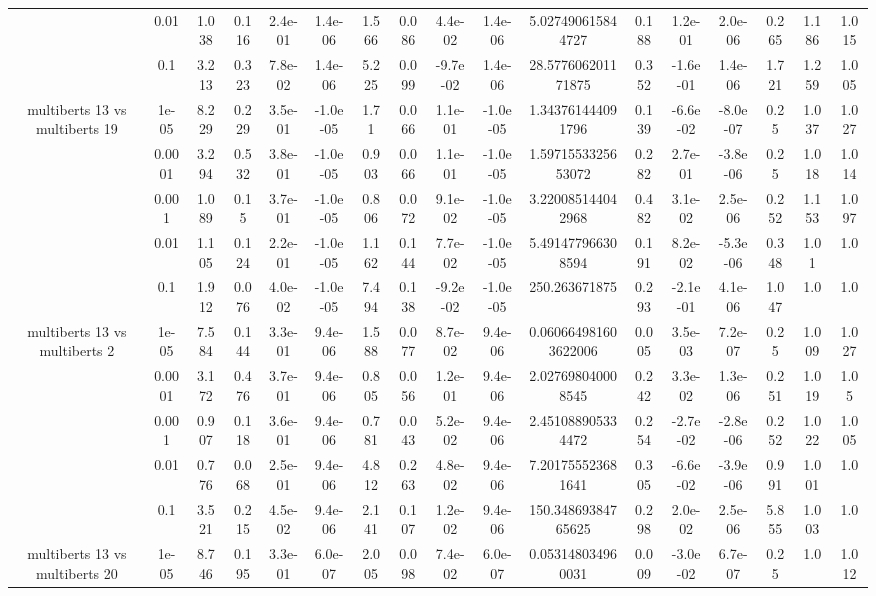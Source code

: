 \begin{tabular}{|c|c|c|c|c|c|c|c|c|c|c|c|c|c|c|c|c|}
 & 0.01 & 1.038 & 0.116 & 2.4e-01 & 1.4e-06 & 1.566 & 0.086 & 4.4e-02 & 1.4e-06 & 5.027490615844727 & 0.188 & 1.2e-01 & 2.0e-06 & 0.265 & 1.186 & 1.015 \\
 & 0.1 & 3.213 & 0.323 & 7.8e-02 & 1.4e-06 & 5.225 & 0.099 & -9.7e-02 & 1.4e-06 & 28.577606201171875 & 0.352 & -1.6e-01 & 1.4e-06 & 1.721 & 1.259 & 1.005 \\
\hline
\multirow{5}{*}{multiberts 13 vs multiberts 19} & 1e-05 & 8.229 & 0.229 & 3.5e-01 & -1.0e-05 & 1.71 & 0.066 & 1.1e-01 & -1.0e-05 & 1.343761444091796 & 0.139 & -6.6e-02 & -8.0e-07 & 0.25 & 1.037 & 1.027 \\
 & 0.0001 & 3.294 & 0.532 & 3.8e-01 & -1.0e-05 & 0.903 & 0.066 & 1.1e-01 & -1.0e-05 & 1.5971553325653072 & 0.282 & 2.7e-01 & -3.8e-06 & 0.25 & 1.018 & 1.014 \\
 & 0.001 & 1.089 & 0.15 & 3.7e-01 & -1.0e-05 & 0.806 & 0.072 & 9.1e-02 & -1.0e-05 & 3.220085144042968 & 0.482 & 3.1e-02 & 2.5e-06 & 0.252 & 1.153 & 1.097 \\
 & 0.01 & 1.105 & 0.124 & 2.2e-01 & -1.0e-05 & 1.162 & 0.144 & 7.7e-02 & -1.0e-05 & 5.491477966308594 & 0.191 & 8.2e-02 & -5.3e-06 & 0.348 & 1.01 & 1.0 \\
 & 0.1 & 1.912 & 0.076 & 4.0e-02 & -1.0e-05 & 7.494 & 0.138 & -9.2e-02 & -1.0e-05 & 250.263671875 & 0.293 & -2.1e-01 & 4.1e-06 & 1.047 & 1.0 & 1.0 \\
\hline
\multirow{5}{*}{multiberts 13 vs multiberts 2} & 1e-05 & 7.584 & 0.144 & 3.3e-01 & 9.4e-06 & 1.588 & 0.077 & 8.7e-02 & 9.4e-06 & 0.060664981603622006 & 0.005 & 3.5e-03 & 7.2e-07 & 0.25 & 1.009 & 1.027 \\
 & 0.0001 & 3.172 & 0.476 & 3.7e-01 & 9.4e-06 & 0.805 & 0.056 & 1.2e-01 & 9.4e-06 & 2.027698040008545 & 0.242 & 3.3e-02 & 1.3e-06 & 0.251 & 1.019 & 1.05 \\
 & 0.001 & 0.907 & 0.118 & 3.6e-01 & 9.4e-06 & 0.781 & 0.043 & 5.2e-02 & 9.4e-06 & 2.451088905334472 & 0.254 & -2.7e-02 & -2.8e-06 & 0.252 & 1.022 & 1.005 \\
 & 0.01 & 0.776 & 0.068 & 2.5e-01 & 9.4e-06 & 4.812 & 0.263 & 4.8e-02 & 9.4e-06 & 7.201755523681641 & 0.305 & -6.6e-02 & -3.9e-06 & 0.991 & 1.001 & 1.0 \\
 & 0.1 & 3.521 & 0.215 & 4.5e-02 & 9.4e-06 & 2.141 & 0.107 & 1.2e-02 & 9.4e-06 & 150.34869384765625 & 0.298 & 2.0e-02 & 2.5e-06 & 5.855 & 1.003 & 1.0 \\
\hline
\multirow{5}{*}{multiberts 13 vs multiberts 20} & 1e-05 & 8.746 & 0.195 & 3.3e-01 & 6.0e-07 & 2.005 & 0.098 & 7.4e-02 & 6.0e-07 & 0.053148034960031 & 0.009 & -3.0e-02 & 6.7e-07 & 0.25 & 1.0 & 1.012 \\

\end{tabular}
